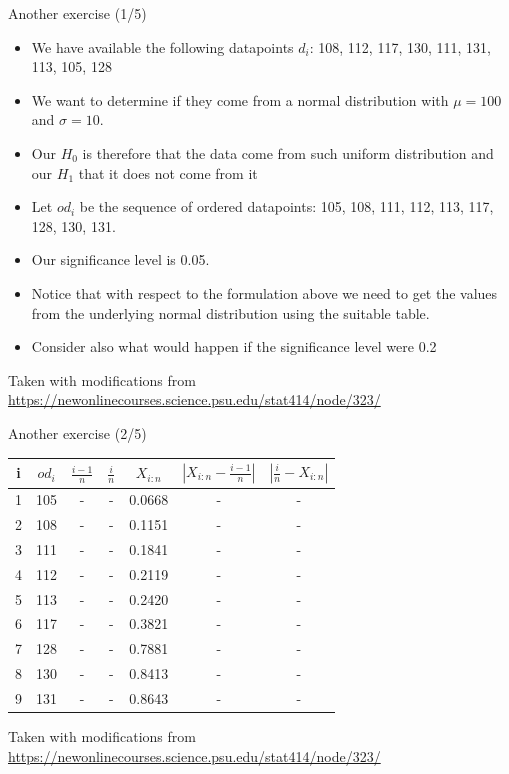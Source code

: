 \documentclass{beamer}
\begin{document}
\begin{frame}
{\centerline{Another exercise (1/5)}}

\begin{itemize}
   \item We have available the following datapoints $d_i$: 108, 112, 117, 130, 111, 131, 113, 105, 128
   \item We want to determine if they come from a normal distribution with $\mu = 100$ and $\sigma = 10$.
   \item Our $H_0$ is therefore that the data come from such uniform distribution and our $H_1$ that it does not come from it
   \item Let $od_i$ be the sequence of ordered datapoints: 105, 108, 111, 112, 113, 117, 128, 130, 131.
   \item Our significance level is 0.05.
   \item Notice that with respect to the formulation above we need to get the values from the underlying normal distribution using the suitable table.
   \item Consider also what would happen if the significance level were 0.2
\end{itemize}

\begin{center}
\tiny{Taken with modifications from \url{https://newonlinecourses.science.psu.edu/stat414/node/323/}}
\end{center}
\end{frame}



\begin{frame}
{\centerline{Another exercise (2/5)}}

\begin{center}
\begin{tabular}{|c|c|c|c|c|c|c|}
	\toprule
	i & $od_i$ & $\frac{i-1}{n}$ & $\frac{i}{n}$ & $X_{i:n}$ & $|X_{i:n} - \frac{i-1}{n} |$ & $|\frac{i}{n} - X_{i:n}|$\\
	\midrule
	1 & 105 & - & - & 0.0668 & - & -\\
	\midrule
	2 & 108 & - & - & 0.1151 & - & -\\
	\midrule
	3 & 111 & - & - & 0.1841 & - & -\\
	\midrule
	4 & 112 & - & - & 0.2119 & - & -\\
	\midrule
	5 & 113 & - & - & 0.2420 & - & -\\
	\midrule
	6 & 117 & - & - & 0.3821 & - & -\\
	\midrule
	7 & 128 & - & - & 0.7881 & - & -\\
	\midrule
	8 & 130 & - & - & 0.8413 & - & -\\
	\midrule
	9 & 131 & - & - & 0.8643 & - & -\\
	\bottomrule
\end{tabular}
\end{center}

\begin{center}
\tiny{Taken with modifications from \url{https://newonlinecourses.science.psu.edu/stat414/node/323/}}
\end{center}
\end{frame}
\end{document}

